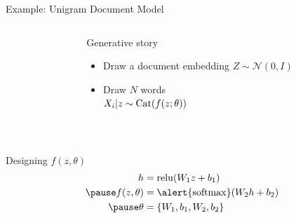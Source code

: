 \documentclass[14pt]{beamer}
\begin{document}
\begin{frame}{Example: Unigram Document Model}


\begin{columns}
	\begin{column}{0.2\textwidth}
    \end{column}
    \begin{column}{0.75\textwidth}
    	Generative story 
    	\begin{itemize}
			\item Draw a document embedding $Z \sim \mathcal N(0, I)$
			\item Draw $N$ words\\
			$X_i|z \sim \operatorname{Cat}(f(z; \theta))$
		\end{itemize}
    \end{column}
    \end{columns}
    \pause
    
    ~
    
    Designing $f(z, \theta)$    \pause
    \begin{equation*}
	\begin{aligned}						
		h &= \relu(W_1z+b_1) \\ \pause
		f(z, \theta) &= \alert{\softmax}(W_2h + b_2) \\		\pause
		\theta &= \{W_1, b_1, W_2, b_2\}
	\end{aligned}
	\end{equation*}
	

\end{frame}
\end{document}

